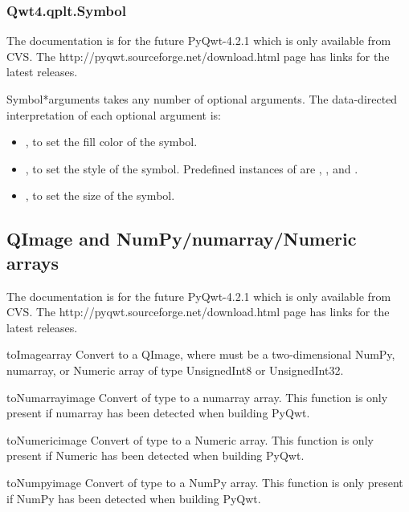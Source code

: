 \documentclass{manual}
\newcommand{\Download}{\ulink{download}
  {http://pyqwt.sourceforge.net/download.html}}
\newcommand{\Future}{
  \begin{notice}[warning]
    The documentation is for the future PyQwt-4.2.1 which is only available
    from CVS. The \Download{} page has links for the latest releases.
  \end{notice}
}
\begin{document}
\subsubsection{Qwt4.qplt.Symbol \label{intro-qplt-symbol}}

\Future{}

\begin{classdesc}{Symbol}{*arguments}
   takes any number of optional arguments.
  The data-directed interpretation of each optional argument is:
  \begin{itemize}
  \item
    , to set the fill color of the symbol.
  \item
    , to set the style of the symbol. Predefined instances
    of  are , ,
     and .
  \item
    , to set the size of the symbol.
  \end{itemize}
\end{classdesc}

\subsection{QImage and NumPy/numarray/Numeric arrays \label{qwt-qimage}}

\Future{}

\begin{funcdesc}{toImage}{array}
  Convert  to a QImage, where  must be a two-dimensional
  NumPy, numarray, or Numeric array of type UnsignedInt8 or UnsignedInt32.
\end{funcdesc}

\begin{funcdesc}{toNumarray}{image}
  Convert  of type  to a numarray array. This function
  is only present if numarray has been detected when building PyQwt.
\end{funcdesc}

\begin{funcdesc}{toNumeric}{image}
  Convert  of type  to a Numeric array. This function
  is only present if Numeric has been detected when building PyQwt.
\end{funcdesc}

\begin{funcdesc}{toNumpy}{image}
  Convert  of type  to a NumPy array. This function
  is only present if NumPy has been detected when building PyQwt.
\end{funcdesc}
\end{document}
